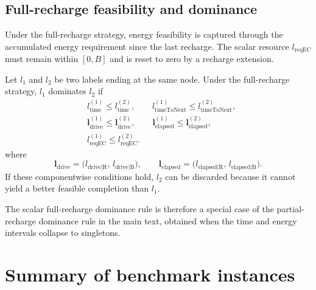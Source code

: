 \documentclass[3p,11pt,authoryear]{elsarticle}  %
\begin{document}

\subsection{Full-recharge feasibility and dominance}


Under the full-recharge strategy, energy feasibility is captured through the accumulated energy requirement since the last recharge. The scalar resource \(l_{\text{reqEC}}\) must remain within \([0,B]\) and is reset to zero by a recharge extension.

Let \(l_1\) and \(l_2\) be two labels ending at the same node. Under the full-recharge strategy, \(l_1\) dominates \(l_2\) if
\[
\begin{aligned}
&l_{\text{time}}^{(1)} \le l_{\text{time}}^{(2)},\qquad
l_{\text{timeToNext}}^{(1)} \le l_{\text{timeToNext}}^{(2)},\\
&\mathbf{l}_{\text{drive}}^{(1)} \le \mathbf{l}_{\text{drive}}^{(2)},\qquad
\mathbf{l}_{\text{elapsed}}^{(1)} \le \mathbf{l}_{\text{elapsed}}^{(2)},\\
&l_{\text{reqEC}}^{(1)} \le l_{\text{reqEC}}^{(2)}.
\end{aligned}
\]
where 
\[
\mathbf{l}_{\text{drive}}
=
\bigl(l_{\text{drive|R}},\,l_{\text{drive|B}}\bigr),
\qquad
\mathbf{l}_{\text{elapsed}}
=
\bigl(l_{\text{elapsed|R}},\,l_{\text{elapsed|B}}\bigr).
\]
If these componentwise conditions hold, \(l_2\) can be discarded because it cannot yield a better feasible completion than \(l_1\).

The scalar full-recharge dominance rule is therefore a special case of the partial-recharge dominance rule in the main text, obtained when the time and energy intervals collapse to singletons.






\newpage
\section{Summary of benchmark instances}\label{appendix:Test_Instance}

\end{document}
